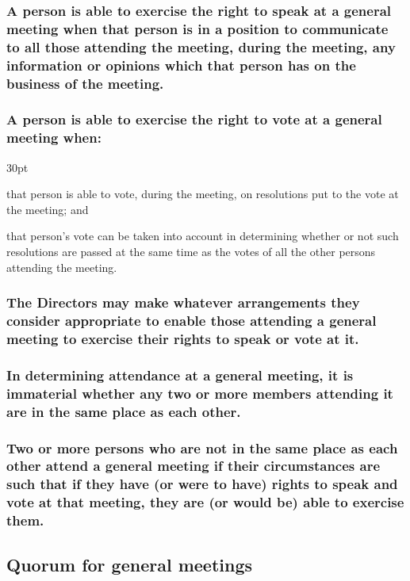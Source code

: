 \documentclass[12pt]{article}
\def\clauseindent{30pt}
\newenvironment{subindentpara}{\begin{adjustwidth}{\clauseindent}{}\begin{hanginglist}}{\end{hanginglist}\end{adjustwidth}}
\begin{document}
\subsubsection[Specifics of attendance at general meetings]{A person is able to exercise the right to speak at a general meeting when that person is in a position to communicate to all those attending the meeting, during the meeting, any information or opinions which that person has on the business of the meeting.}
\subsubsection[Specifics of voting at general meetings]{A person is able to exercise the right to vote at a general meeting when:}
\begin{subindentpara}
    \item that person is able to vote, during the meeting, on resolutions put to the vote at the meeting; and
    \item that person's vote can be taken into account in determining whether or not such resolutions are passed at the same time as the votes of all the other persons attending the meeting.
\end{subindentpara}
\subsubsection[Directors may make any arrangements to enable participation]{The Directors may make whatever arrangements they consider appropriate to enable those attending a general meeting to exercise their rights to speak or vote at it.}
\subsubsection[Attendees' location at meetings is irrelevant]{In determining attendance at a general meeting, it is immaterial whether any two or more members attending it are in the same place as each other.}
\subsubsection[Attendees may exercise rights at any location]{Two or more persons who are not in the same place as each other attend a general meeting if their circumstances are such that if they have (or were to have) rights to speak and vote at that meeting, they are (or would be) able to exercise them.}

\subsection{Quorum for general meetings}
\end{document}
